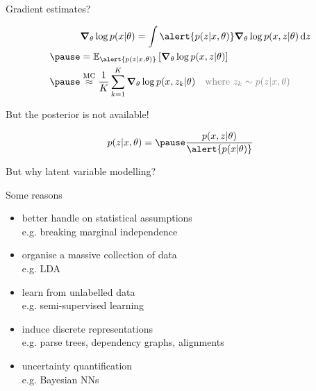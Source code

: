 \begin{frame}{Gradient estimates?}

\begin{equation*}
\begin{aligned}
&\grad_\theta \log p(x|\theta) = \int \alert{p(z|x, \theta)} \grad_\theta \log p(x,z|\theta) \dd{z} \\ \pause
&= \mathbb E_{\alert{p(z|x, \theta)}} \left[ \grad_\theta \log p(x,z|\theta) \right] \\ \pause
&\overset{\text{MC}}{\approx} \frac{1}{K} \sum_{k=1}^K \grad_\theta \log p(x, z_k|\theta) 
\quad \textcolor{gray}{\text{where }z_k \sim p(z|x, \theta)}
\end{aligned}
\end{equation*}

\pause But the posterior is not available!

\begin{equation*}
\begin{aligned}
	p(z|x, \theta) = \pause \frac{p(x, z|\theta)}{\alert{p(x|\theta)}} %
\end{aligned}
\end{equation*}

\end{frame}


\begin{frame}{But why latent variable modelling?}

Some reasons

\begin{itemize}
	\item better handle on statistical assumptions\\
	e.g. breaking marginal independence \pause
	\item organise a massive collection of data\\
	e.g. LDA	 \pause
	\item learn from unlabelled data\\
	e.g. semi-supervised learning \pause
	\item induce discrete representations\\
	e.g. parse trees, dependency graphs, alignments \pause
	\item uncertainty quantification\\
	e.g. Bayesian NNs 
\end{itemize}

\end{frame}

